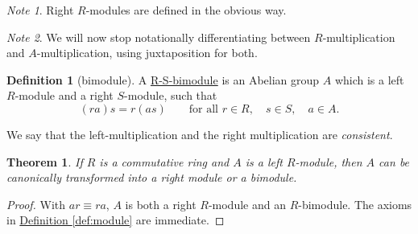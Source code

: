 \documentclass[a4paper,10pt]{scrreprt}
\newcommand{\defn}[1]{\ul{#1}}
\theoremstyle{definition}
\newtheorem{definition}{Definition}[section]
\theoremstyle{plain}
\newtheorem{theorem}{Theorem}[section]
\theoremstyle{remark}
\newtheorem{note}{Note}[section]
\begin{document}
\begin{note}
  Right $R$-modules are defined in the obvious way.
\end{note}

\begin{note}
  We will now stop notationally differentiating between $R$-multiplication and $A$-multiplication, using juxtaposition for both.
\end{note}

\begin{definition}[bimodule]
  \label{def:bimodule}
  A \defn{R-S-bimodule} is an Abelian group $A$ which is a left $R$-module and a right $S$-module, such that 
  \begin{equation*}
    (ra)s = r(as)\qquad\text{for all } r\in R,\quad s\in S,\quad a\in A.
  \end{equation*}

  We say that the left-multiplication and the right multiplication are \emph{consistent}.
\end{definition}

\begin{theorem}
  \label{thm:leftmoduletransformstoothermodules}
  If $R$ is a commutative ring and $A$ is a left $R$-module, then $A$ can be canonically transformed into a right module or a bimodule.
\end{theorem}
\begin{proof}
  With $ar \equiv ra$, $A$ is both a right $R$-module and an $R$-bimodule. The axioms in \hyperref[def:module]{Definition \ref*{def:module}} are immediate.
\end{proof}
\end{document}

